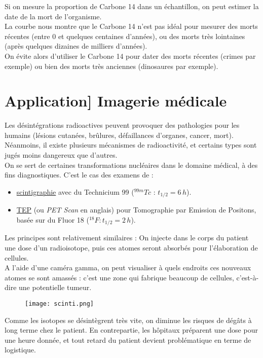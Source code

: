 \documentclass[a4paper]{article}
\begin{document}
\begin{Large}
\noindent Si on mesure la proportion de Carbone 14 dans un échantillon, on peut estimer la date de la mort de l'organisme.\\
La courbe nous montre que le Carbone 14 n'est pas idéal pour mesurer des morts récentes (entre 0 et quelques centaines d'années), ou des morts très lointaines (après quelques dizaines de milliers d'années).\\

\noindent On évite alors d'utiliser le Carbone 14 pour dater des morts récentes (crimes par exemple) ou bien des morts très anciennes (dinosaures par exemple).

\newpage
\section*{Application] Imagerie médicale}
Les désintégrations radioactives peuvent provoquer des pathologies pour les humains (lésions cutanées, brûlures, défaillances d'organes, cancer, mort).\\
Néanmoins, il existe plusieurs mécanismes de radioactivité, et certains types sont jugés moins dangereux que d'autres.\\

\noindent On se sert de certaines transformations nucléaires dans le domaine médical, à des fins diagnostiques. C'est le cas des examens de :
\begin{itemize}
\item \underline{scintigraphie} avec du Technicium 99 ($^{99m}Tc$ : $t_{1/2} = 6\,h$).
\item \underline{TEP} (ou \emph{PET Scan} en anglais) pour Tomographie par Emission de Positons, basée sur du Fluor 18 ($^{18}F : t_{1/2} = 2\,h$).
\end{itemize}

\noindent Les principes sont relativement similaires : On injecte dans le corps du patient une dose d'un radioisotope, puis ces atomes seront absorbés pour l'élaboration de cellules. \\A l'aide d'une caméra gamma, on peut visualiser à quels endroits ces nouveaux atomes se sont amassés : c'est une zone qui fabrique beaucoup de cellules, c'est-à-dire une potentielle tumeur.\\

\begin{figure}[H]
\begin{center}
\texttt{[image: scinti.png]}
\end{center} 
\end{figure}

\noindent Comme les isotopes se désintègrent très vite, on diminue les risques de dégâts à long terme chez le patient. En contrepartie, les hôpitaux préparent une dose pour une heure donnée, et tout retard du patient devient problématique en terme de logistique.

\end{Large}
\end{document}
